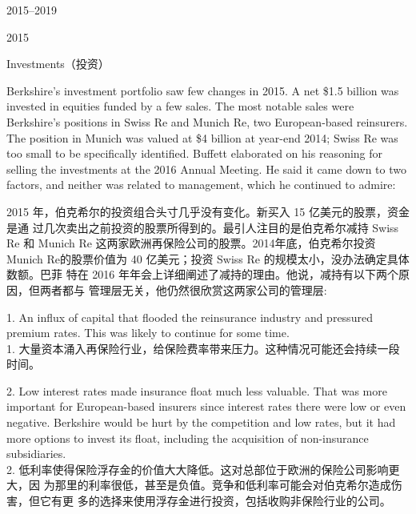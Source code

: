 \begin{chapter}{2015--2019}
\begin{section}{2015}
\begin{subsection}{Investments（投资）}
\begin{verseparallel}
{    Berkshire's investment portfolio saw few changes in 2015. A net \$1.5
    billion was invested in equities funded by a few sales. The most notable
    sales were Berkshire's positions in Swiss Re and Munich Re, two
    European-based reinsurers. The position in Munich was valued at \$4 billion
    at year-end 2014; Swiss Re was too small to be specifically identified.
    Buffett elaborated on his reasoning for selling the investments at the 2016
    Annual Meeting. He said it came down to two factors, and neither was
    related to management, which he continued to admire:    

  }
  {
    2015 年，伯克希尔的投资组合头寸几乎没有变化。新买入 15 亿美元的股票，资金是通
    过几次卖出之前投资的股票所得到的。最引人注目的是伯克希尔减持 Swiss
    Re 和 Munich Re 这两家欧洲再保险公司的股票。2014年底，伯克希尔投资 Munich
    Re的股票价值为 40 亿美元；投资 Swiss Re 的规模太小，没办法确定具体数额。巴菲
    特在 2016 年年会上详细阐述了减持的理由。他说，减持有以下两个原因，但两者都与
    管理层无关，他仍然很欣赏这两家公司的管理层:
  }
\end{verseparallel}    

{\color{green}{此处应为列表项 \\}}

\begin{verseparallel}
  {
    1. An influx of capital that flooded the reinsurance industry and pressured
    premium rates. This was likely to continue for some time. \\
  }
  {
    1. 大量资本涌入再保险行业，给保险费率带来压力。这种情况可能还会持续一段时间。
  }
\end{verseparallel}

\begin{verseparallel}
  {
    2. Low interest rates made insurance float much less valuable. That was more
    important for European-based insurers since interest rates there were low or
    even negative. Berkshire would be hurt by the competition and low rates, but
    it had more options to invest its float, including the acquisition of
    non-insurance subsidiaries. \\
  }
  {
    2. 低利率使得保险浮存金的价值大大降低。这对总部位于欧洲的保险公司影响更大，因
    为那里的利率很低，甚至是负值。竞争和低利率可能会对伯克希尔造成伤害，但它有更
    多的选择来使用浮存金进行投资，包括收购非保险行业的公司。
  }
\end{verseparallel}


\end{subsection}
\end{section}
\end{chapter}
